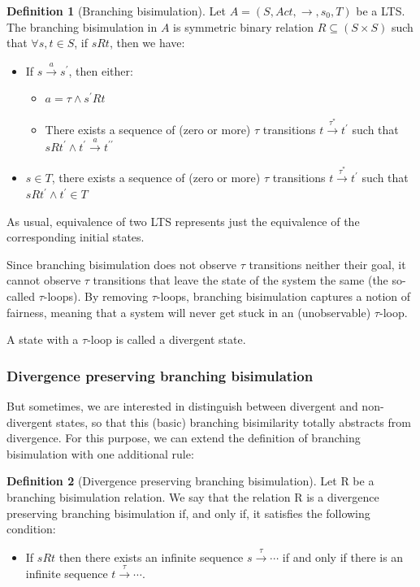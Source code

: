 \documentclass[11pt]{article}
\theoremstyle{definition}
\newtheorem{definition}{Definition}
\theoremstyle{plain}
\begin{document}
\begin{definition} [Branching bisimulation]
	Let $ A = (S, Act, \rightarrow, s_0, T) $ be a LTS. The branching bisimulation in $ A $ is symmetric binary relation $ R  \subseteq (S\times S) $ such that $\forall s, t \in S$, if $ s R t $, then we have:
	\begin{itemize}
		\item If $ s\xrightarrow{a}s^\prime $, then either:
		\begin{itemize}
			\item $ a = \tau \wedge s^\prime  R t $
			\item There exists a sequence of (zero or more) $ \tau $ transitions $ t\xrightarrow{\tau^*}t^\prime  $ such that $ s R t^\prime  \wedge t^\prime \xrightarrow{a}t^{\prime\prime} $
		\end{itemize}
		\item $ s \in T $, there exists a sequence of (zero or more) $ \tau $ transitions $ t\xrightarrow{\tau^*}t^\prime  $ such that $ s R t^\prime  \wedge t^\prime  \in T $
	\end{itemize}
\end{definition}

As usual, equivalence of two LTS represents just the equivalence of the corresponding initial states.

Since branching bisimulation does not observe $ \tau $ transitions neither their goal, it cannot observe $ \tau $ transitions that leave the state of the system the same (the so-called $ \tau $-loops). By removing $ \tau $-loops, branching bisimulation captures a notion of fairness, meaning that a system will never get stuck in an (unobservable) $ \tau $-loop.

A state with a $ \tau $-loop is called a divergent state.

\subsubsection{Divergence preserving branching bisimulation}
But sometimes, we are interested in distinguish between divergent and non-divergent states, so that this (basic) branching bisimilarity totally abstracts from divergence. For this purpose, we can extend the definition of branching bisimulation with one additional rule:
\begin{definition} [Divergence preserving branching bisimulation]
	Let R be a branching bisimulation relation. We say that the relation R is a divergence preserving branching bisimulation if, and only if, it satisfies the following condition:
	\begin{itemize}
		\item If $ s R t $ then there exists an infinite sequence $ s\xrightarrow{\tau}\cdots $ if and only if there is an infinite sequence $ t\xrightarrow{\tau}\cdots$.
	\end{itemize}
\end{definition}
\end{document}
